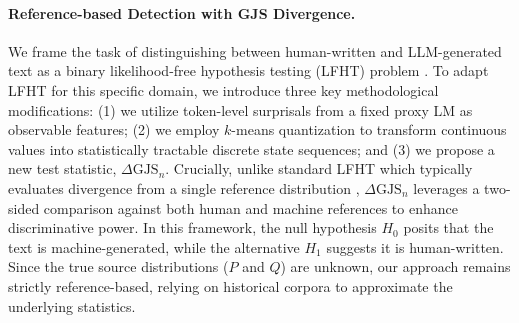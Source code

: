 \documentclass{article}
\theoremstyle{plain}
\theoremstyle{definition}
\theoremstyle{remark}
\begin{document}
\paragraph{Reference-based Detection with GJS Divergence.} 
We frame the task of distinguishing between human-written and LLM-generated text as a binary likelihood-free hypothesis testing (LFHT) problem \cite{32134, gerber2024likelihood}. To adapt LFHT for this specific domain, we introduce three key methodological modifications: (1) we utilize token-level surprisals from a fixed proxy LM as observable features; (2) we employ $k$-means quantization to transform continuous values into statistically tractable discrete state sequences; and (3) we propose a new test statistic, $\Delta \text{GJS}_n$. Crucially, unlike standard LFHT which typically evaluates divergence from a single reference distribution \cite{32134}, $\Delta \text{GJS}_n$ leverages a two-sided comparison against both human and machine references to enhance discriminative power. In this framework, the null hypothesis $H_0$ posits that the text is machine-generated, while the alternative $H_1$ suggests it is human-written. Since the true source distributions ($P$ and $Q$) are unknown, our approach remains strictly reference-based, relying on historical corpora to approximate the underlying statistics.
\end{document}
